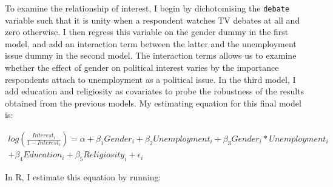 \documentclass[
]{article}
\begin{document}
To examine the relationship of interest, I begin by dichotomising the
\texttt{debate} variable such that it is unity when a respondent watches
TV debates at all and zero otherwise. I then regress this variable on
the gender dummy in the first model, and add an interaction term between
the latter and the unemployment issue dummy in the second model. The
interaction terms allows us to examine whether the effect of gender on
political interest varies by the importance respondents attach to
unemployment as a political issue. In the third model, I add education
and religiosity as covariates to probe the robustness of the results
obtained from the previous models. My estimating equation for this final
model is:

\[
\begin{aligned}
log(\frac{Interest_{i}}{1-Interest_{i}}) = \alpha + \beta_{1}Gender_{i} +  \beta_{2}Unemployment_{i} + \beta_{3}Gender_{i}*Unemployment_{i} \\ 
+ \beta_{4}Education_{i} + \beta_{5}Religiosity_{i} + \epsilon_{i}
\end{aligned}
\]

In R, I estimate this equation by running:
\end{document}
